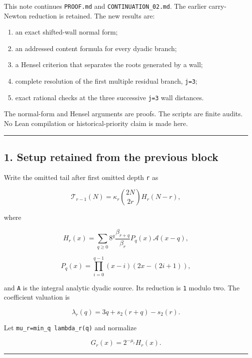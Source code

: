 \documentclass[11pt,letterpaper]{article}
\providecommand{\tightlist}{\setlength{\itemsep}{0pt}\setlength{\parskip}{0pt}}
\begin{document}
This note continues \texttt{PROOF.md} and \texttt{CONTINUATION\_02.md}. The earlier carry-Newton reduction is retained. The new results are:

\begin{enumerate}
\def\labelenumi{\arabic{enumi}.}
\tightlist
\item
  an exact shifted-wall normal form;
\item
  an addressed content formula for every dyadic branch;
\item
  a Hensel criterion that separates the roots generated by a wall;
\item
  complete resolution of the first multiple residual branch, \texttt{j=3};
\item
  exact rational checks at the three successive \texttt{j=3} wall distances.
\end{enumerate}

The normal-form and Hensel arguments are proofs. The scripts are finite audits. No Lean compilation or historical-priority claim is made here.

\begin{center}\rule{0.5\linewidth}{0.5pt}\end{center}

\subsection{1. Setup retained from the previous block}\label{setup-retained-from-the-previous-block}

Write the omitted tail after first omitted depth \texttt{r} as

\[
\mathcal T_{r-1}(N)
=\kappa_r\binom{2N}{2r}H_r(N-r),
\]

where

\[
H_r(x)=\sum_{q\ge0}
8^q\frac{\beta_{r+q}}{\beta_r}
P_q(x)\mathscr A(x-q),
\]

\[
P_q(x)=\prod_{i=0}^{q-1}(x-i)(2x-(2i+1)),
\]

and \texttt{A} is the integral analytic dyadic source. Its reduction is \texttt{1} modulo two. The coefficient valuation is

\[
\lambda_r(q)=3q+s_2(r+q)-s_2(r).
\]

Let \texttt{mu\_r=min\_q\ lambda\_r(q)} and normalize

\[
G_r(x)=2^{-\mu_r}H_r(x).
\]

\begin{center}\rule{0.5\linewidth}{0.5pt}\end{center}
\end{document}
